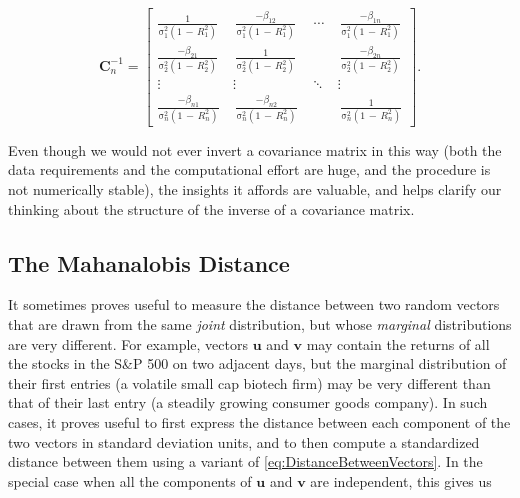 \documentclass[graybox,envcountchap,sectrefs]{svmono}\usepackage[]{graphicx}\usepackage[]{xcolor}
\begin{document}
\begin{appendices}
\begin{equation}
\mathrm{\mathbf{C}}_{n}^{-1}=\left[\begin{array}{cccc}
\frac{1}{\mathrm{\sigma}_{1}^{2}\left(1\,-\,R_{1}^{2}\right)}\, & \,\frac{-\beta_{12}}{\mathrm{\sigma}_{1}^{2}\left(1\,-\,R_{1}^{2}\right)}\, & \,\cdots\, & \,\frac{-\beta_{1n}}{\mathrm{\sigma}_{1}^{2}\left(1\,-\,R_{1}^{2}\right)}\\
\frac{-\beta_{21}}{\mathrm{\sigma}_{2}^{2}\left(1\,-\,R_{2}^{2}\right)}\, & \,\frac{1}{\mathrm{\sigma}_{2}^{2}\left(1\,-\,R_{2}^{2}\right)}\, &  & \,\frac{-\beta_{2n}}{\mathrm{\sigma}_{2}^{2}\left(1\,-\,R_{2}^{2}\right)}\\
\vdots & \vdots & \,\ddots\, & \vdots\\
\frac{-\beta_{n1}}{\mathrm{\sigma}_{n}^{2}\left(1\,-\,R_{n}^{2}\right)}\, & \,\frac{-\beta_{n2}}{\mathrm{\sigma}_{n}^{2}\left(1\,-\,R_{n}^{2}\right)}\, &  & \,\frac{1}{\mathrm{\sigma}_{n}^{2}\left(1\,-\,R_{n}^{2}\right)}
\end{array}\right].\label{eq:GuyStevensInverse5}
\end{equation}

Even though we would not ever invert a covariance matrix in this way
(both the data requirements and the computational effort are huge,
and the procedure is not numerically stable), the insights it affords
are valuable, and helps clarify our thinking about the structure of
the inverse of a covariance matrix.

\subsection{The Mahanalobis Distance}

It sometimes proves useful to measure the distance between two random
vectors that are drawn from the same \emph{joint} distribution, but
whose \emph{marginal} distributions are very different. For example,
vectors $\mathrm{\mathbf{u}}$ and $\mathrm{\mathbf{v}}$ may contain
the returns of all the stocks in the S\&P 500 on two adjacent days,
but the marginal distribution of their first entries (a volatile small
cap biotech firm) may be very different than that of their last entry
(a steadily growing consumer goods company). In such cases, it proves
useful to first express the distance between each component of the
two vectors in standard deviation units, and to then compute a standardized
distance between them using a variant of \eqref{eq:DistanceBetweenVectors}.
In the special case when all the components of $\mathrm{\mathbf{u}}$
and $\mathrm{\mathbf{v}}$ are independent, this gives us


\end{appendices}
\end{document}
